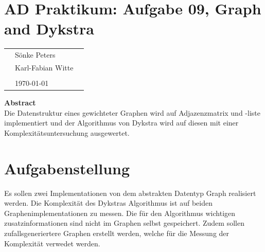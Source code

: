 \documentclass[
   draft=false
  ,paper=a4
  ,twoside=false
  ,fontsize=11pt
  ,headsepline
  ,DIV11
  ,parskip=full+
]{scrartcl} %
\begin{document}
\def\titel{AD Praktikum: Aufgabe 09, Graph and Dykstra}


\def\teilnehmer{ 
	& Sönke Peters & \\
    & Karl-Fabian Witte   & \\
}




\newlength{\txtw} %
\setlength{\txtw}{\textwidth} %
\addtolength{\txtw}{-10\tabcolsep} %

\def\me{\myName \newline \footnotesize{\url{\myEmail} } }

\section*{\titel}
\begin{tabular}{l p{0.4\txtw} p{0.4\txtw} }
	\teilnehmer
	& & \\
	& \today & \\
\end{tabular}


\centering
\textbf{Abstract} \\
Die Datenstruktur eines gewichteter Graphen wird auf Adjazenzmatrix und -liste implementiert und der Algorithmus von Dykstra wird auf diesen mit 
einer Komplexitätsuntersuchung ausgewertet. 
\normalsize \flushleft
\section{Aufgabenstellung}
Es sollen zwei Implementationen von dem abstrakten Datentyp Graph 
realisiert werden. Die Komplexität des Dykstras Algorithmus 
ist auf beiden Graphenimplementationen zu messen. Die für den 
Algorithmus wichtigen zusatzinformationen sind nicht im Graphen
selbst gespeichert. 
Zudem sollen zufallsgeneriertere Graphen erstellt werden, welche 
für die Messung der Komplexität verwedet werden.
\end{document}
